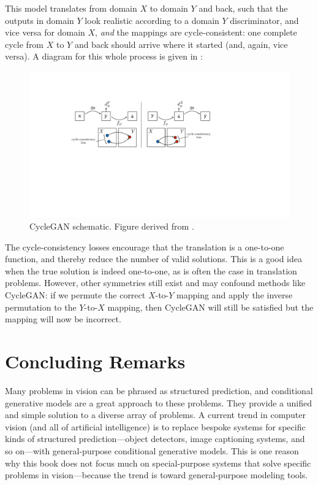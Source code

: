 This model translates from domain $X$ to domain $Y$ and back, such that the outputs in domain $Y$ look realistic according to a domain $Y$ discriminator, and vice versa for domain $X$, \textit{and} the mappings are cycle-consistent: one complete cycle from $X$ to $Y$ and back should arrive where it started (and, again, vice versa). A diagram for this whole process is given in \fig{\ref{fig:conditional_generative_models:cyclegan_schematic}}:
\begin{figure}[h!]
    \centerline{
        \includegraphics[width=1.0\linewidth]{./figures/conditional_generative_models/cyclegan_schematic.pdf}
    }
    \caption{CycleGAN schematic. Figure derived from \cite{CycleGAN2017}.}
    \label{fig:conditional_generative_models:cyclegan_schematic}
\end{figure}

The cycle-consistency losses encourage that the translation is a one-to-one function, and thereby reduce the number of valid solutions. This is a good idea when the true solution is indeed one-to-one, as is often the case in translation problems. However, other symmetries still exist and may confound methods like CycleGAN: if we permute the correct $X$-to-$Y$ mapping and apply the inverse permutation to the $Y$-to-$X$ mapping, then CycleGAN will still be satisfied but the mapping will now be incorrect.


\section{Concluding Remarks}
Many problems in vision can be phrased as structured prediction, and conditional generative models are a great approach to these problems. They provide a unified and simple solution to a diverse array of problems. A current trend in computer vision (and all of artificial intelligence) is to replace bespoke systems for specific kinds of structured prediction—object detectors, image captioning systems, and so on—with general-purpose conditional generative models. This is one reason why this book does not focus much on special-purpose systems that solve specific problems in vision—because the trend is toward general-purpose modeling tools.